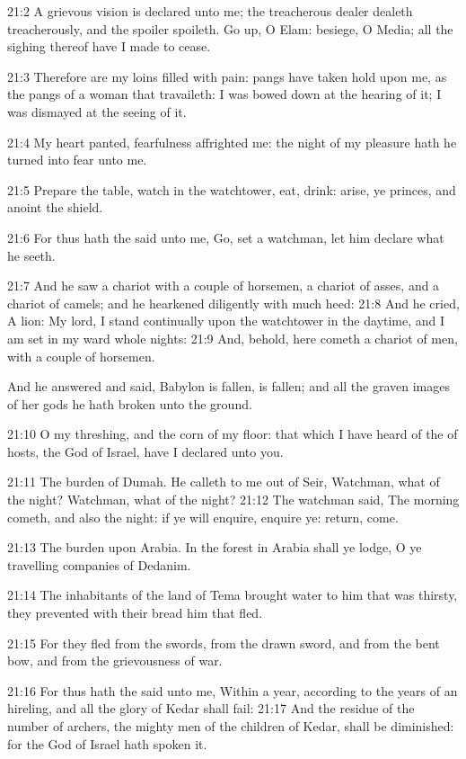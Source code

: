 21:2 A grievous vision is declared unto me; the treacherous dealer dealeth treacherously, and the spoiler spoileth. Go up, O Elam: besiege, O Media; all the sighing thereof have I made to cease.

21:3 Therefore are my loins filled with pain: pangs have taken hold upon me, as the pangs of a woman that travaileth: I was bowed down at the hearing of it; I was dismayed at the seeing of it.

21:4 My heart panted, fearfulness affrighted me: the night of my pleasure hath he turned into fear unto me.

21:5 Prepare the table, watch in the watchtower, eat, drink: arise, ye princes, and anoint the shield.

21:6 For thus hath the \LORD said unto me, Go, set a watchman, let him declare what he seeth.

21:7 And he saw a chariot with a couple of horsemen, a chariot of asses, and a chariot of camels; and he hearkened diligently with much heed: 21:8 And he cried, A lion: My lord, I stand continually upon the watchtower in the daytime, and I am set in my ward whole nights: 21:9 And, behold, here cometh a chariot of men, with a couple of horsemen.

And he answered and said, Babylon is fallen, is fallen; and all the graven images of her gods he hath broken unto the ground.

21:10 O my threshing, and the corn of my floor: that which I have heard of the \LORD of hosts, the God of Israel, have I declared unto you.

21:11 The burden of Dumah. He calleth to me out of Seir, Watchman, what of the night? Watchman, what of the night?  21:12 The watchman said, The morning cometh, and also the night: if ye will enquire, enquire ye: return, come.

21:13 The burden upon Arabia. In the forest in Arabia shall ye lodge, O ye travelling companies of Dedanim.

21:14 The inhabitants of the land of Tema brought water to him that was thirsty, they prevented with their bread him that fled.

21:15 For they fled from the swords, from the drawn sword, and from the bent bow, and from the grievousness of war.

21:16 For thus hath the \LORD said unto me, Within a year, according to the years of an hireling, and all the glory of Kedar shall fail: 21:17 And the residue of the number of archers, the mighty men of the children of Kedar, shall be diminished: for the \LORD God of Israel hath spoken it.

